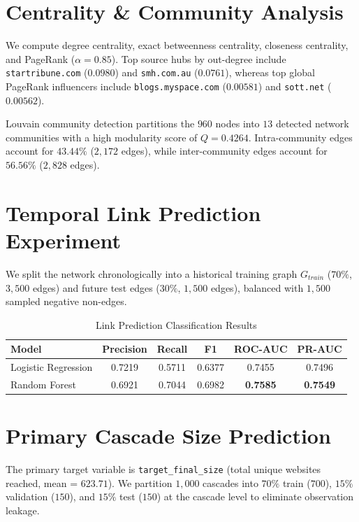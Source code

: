 \documentclass[10pt,journal,compsoc]{IEEEtran}
\begin{document}
\section{Centrality & Community Analysis}
We compute degree centrality, exact betweenness centrality, closeness centrality, and PageRank ($\alpha=0.85$). Top source hubs by out-degree include \texttt{startribune.com} ($0.0980$) and \texttt{smh.com.au} ($0.0761$), whereas top global PageRank influencers include \texttt{blogs.myspace.com} ($0.00581$) and \texttt{sott.net} ($0.00562$).

Louvain community detection partitions the $960$ nodes into $13$ detected network communities with a high modularity score of $Q = 0.4264$. Intra-community edges account for $43.44\%$ ($2,172$ edges), while inter-community edges account for $56.56\%$ ($2,828$ edges).

\section{Temporal Link Prediction Experiment}
We split the network chronologically into a historical training graph $G_{train}$ ($70\%$, $3,500$ edges) and future test edges ($30\%$, $1,500$ edges), balanced with $1,500$ sampled negative non-edges.

\begin{table}[h]
\caption{Link Prediction Classification Results}
\label{tab:link_prediction}
\centering
\begin{tabular}{lccccc}
\toprule
\textbf{Model} & \textbf{Precision} & \textbf{Recall} & \textbf{F1} & \textbf{ROC-AUC} & \textbf{PR-AUC} \\
\midrule
Logistic Regression & 0.7219 & 0.5711 & 0.6377 & 0.7455 & 0.7496 \\
Random Forest & 0.6921 & 0.7044 & 0.6982 & \textbf{0.7585} & \textbf{0.7549} \\
\bottomrule
\end{tabular}
\end{table}

\section{Primary Cascade Size Prediction}
The primary target variable is \texttt{target\_final_size} (total unique websites reached, mean = $623.71$). We partition $1,000$ cascades into $70\%$ train ($700$), $15\%$ validation ($150$), and $15\%$ test ($150$) at the cascade level to eliminate observation leakage.
\end{document}
